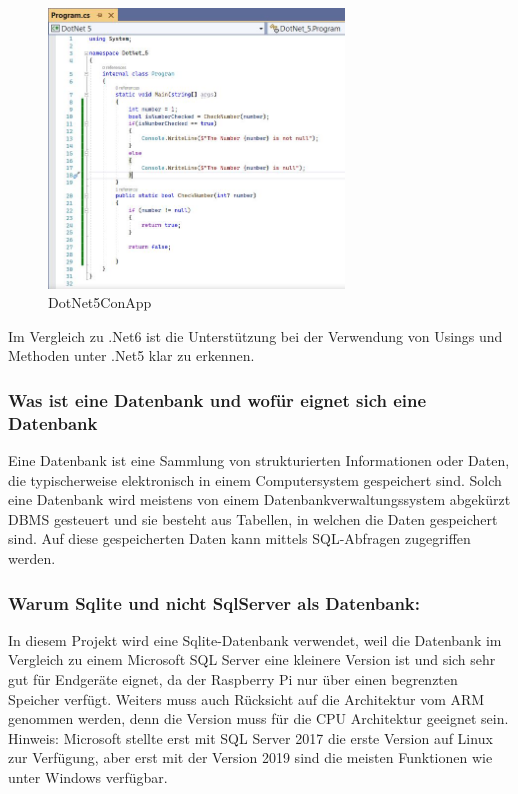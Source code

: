 \begin{figure}[H]
    \centering
    \includegraphics[width=0.7\textwidth]{./pics/DotNet5ConApp.JPG}
    \caption{DotNet5ConApp}
\end{figure}


Im Vergleich zu .Net6 ist die Unterstützung bei der Verwendung von Usings und Methoden unter .Net5 klar zu erkennen.
\cite{.Net6}

\subsubsection*{Was ist eine Datenbank und wofür eignet sich eine Datenbank}
Eine Datenbank ist eine Sammlung von strukturierten Informationen oder Daten, die typischerweise elektronisch in einem Computersystem gespeichert sind.
Solch eine Datenbank wird meistens von einem Datenbankverwaltungssystem abgekürzt DBMS gesteuert und sie besteht aus Tabellen, in welchen die Daten gespeichert sind.
Auf diese gespeicherten Daten kann mittels SQL-Abfragen zugegriffen werden.
\cite{Database}


\subsubsection*{Warum Sqlite und nicht SqlServer als Datenbank:}

In diesem Projekt wird eine Sqlite-Datenbank verwendet, weil die Datenbank im Vergleich zu einem Microsoft SQL Server eine kleinere
Version ist und sich sehr gut für Endgeräte eignet, da der Raspberry Pi nur über einen begrenzten Speicher verfügt.
Weiters muss auch Rücksicht auf die Architektur vom ARM genommen werden, denn die Version muss für die CPU Architektur geeignet sein.
Hinweis: Microsoft stellte erst mit SQL Server 2017 die erste Version auf Linux zur Verfügung, aber erst mit der Version 2019 sind die meisten
Funktionen wie unter Windows verfügbar.

